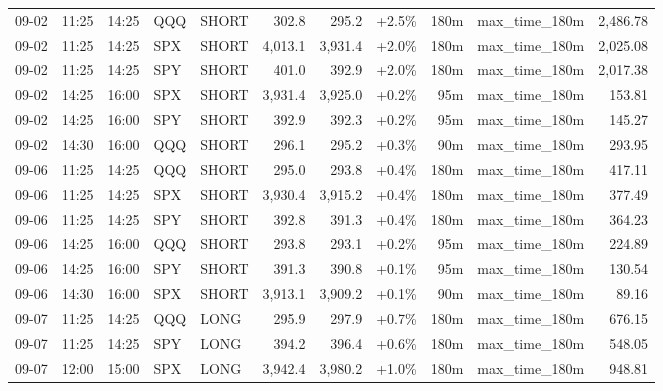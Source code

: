\documentclass[11pt,a4paper,twoside]{article}
\begin{document}
\begin{center}
\begin{longtable}{>{\color{txtmain}}l l l l l r r r r >{\color{txtmain}}l r}
09-02 & 11:25 & 14:25 & QQQ & SHORT & 302.8 & 295.2 & \textcolor{wingreen}{+2.5\%} & 180m & max\_time\_180m & \textcolor{wingreen}{2,486.78} \\
09-02 & 11:25 & 14:25 & SPX & SHORT & 4,013.1 & 3,931.4 & \textcolor{wingreen}{+2.0\%} & 180m & max\_time\_180m & \textcolor{wingreen}{2,025.08} \\
09-02 & 11:25 & 14:25 & SPY & SHORT & 401.0 & 392.9 & \textcolor{wingreen}{+2.0\%} & 180m & max\_time\_180m & \textcolor{wingreen}{2,017.38} \\
09-02 & 14:25 & 16:00 & SPX & SHORT & 3,931.4 & 3,925.0 & \textcolor{wingreen}{+0.2\%} & 95m & max\_time\_180m & \textcolor{wingreen}{153.81} \\
09-02 & 14:25 & 16:00 & SPY & SHORT & 392.9 & 392.3 & \textcolor{wingreen}{+0.2\%} & 95m & max\_time\_180m & \textcolor{wingreen}{145.27} \\
09-02 & 14:30 & 16:00 & QQQ & SHORT & 296.1 & 295.2 & \textcolor{wingreen}{+0.3\%} & 90m & max\_time\_180m & \textcolor{wingreen}{293.95} \\
09-06 & 11:25 & 14:25 & QQQ & SHORT & 295.0 & 293.8 & \textcolor{wingreen}{+0.4\%} & 180m & max\_time\_180m & \textcolor{wingreen}{417.11} \\
09-06 & 11:25 & 14:25 & SPX & SHORT & 3,930.4 & 3,915.2 & \textcolor{wingreen}{+0.4\%} & 180m & max\_time\_180m & \textcolor{wingreen}{377.49} \\
09-06 & 11:25 & 14:25 & SPY & SHORT & 392.8 & 391.3 & \textcolor{wingreen}{+0.4\%} & 180m & max\_time\_180m & \textcolor{wingreen}{364.23} \\
09-06 & 14:25 & 16:00 & QQQ & SHORT & 293.8 & 293.1 & \textcolor{wingreen}{+0.2\%} & 95m & max\_time\_180m & \textcolor{wingreen}{224.89} \\
09-06 & 14:25 & 16:00 & SPY & SHORT & 391.3 & 390.8 & \textcolor{wingreen}{+0.1\%} & 95m & max\_time\_180m & \textcolor{wingreen}{130.54} \\
09-06 & 14:30 & 16:00 & SPX & SHORT & 3,913.1 & 3,909.2 & \textcolor{wingreen}{+0.1\%} & 90m & max\_time\_180m & \textcolor{wingreen}{89.16} \\
09-07 & 11:25 & 14:25 & QQQ & LONG & 295.9 & 297.9 & \textcolor{wingreen}{+0.7\%} & 180m & max\_time\_180m & \textcolor{wingreen}{676.15} \\
09-07 & 11:25 & 14:25 & SPY & LONG & 394.2 & 396.4 & \textcolor{wingreen}{+0.6\%} & 180m & max\_time\_180m & \textcolor{wingreen}{548.05} \\
09-07 & 12:00 & 15:00 & SPX & LONG & 3,942.4 & 3,980.2 & \textcolor{wingreen}{+1.0\%} & 180m & max\_time\_180m & \textcolor{wingreen}{948.81} \\

\end{longtable}
\end{center}
\end{document}
